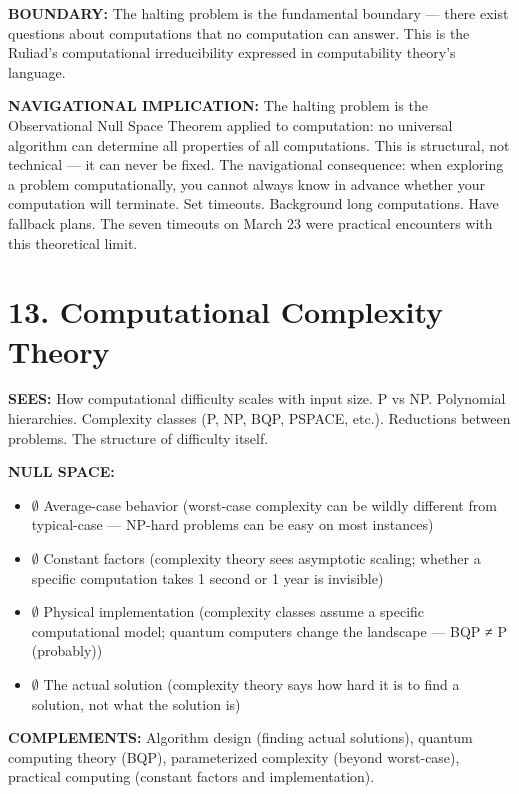 \textbf{BOUNDARY:} The halting problem is the fundamental boundary — there exist questions about computations that no computation can answer. This is the Ruliad's computational irreducibility expressed in computability theory's language.


\textbf{NAVIGATIONAL IMPLICATION:} The halting problem is the Observational Null Space Theorem applied to computation: no universal algorithm can determine all properties of all computations. This is structural, not technical — it can never be fixed. The navigational consequence: when exploring a problem computationally, you cannot always know in advance whether your computation will terminate. Set timeouts. Background long computations. Have fallback plans. The seven timeouts on March 23 were practical encounters with this theoretical limit.


\bigskip\noindent\makebox[\textwidth]{\color{rulegray}\rule{5cm}{0.3pt}}\bigskip


\section*{13. Computational Complexity Theory}


\textbf{SEES:} How computational difficulty scales with input size. P vs NP. Polynomial hierarchies. Complexity classes (P, NP, BQP, PSPACE, etc.). Reductions between problems. The structure of difficulty itself.


\textbf{NULL SPACE:}

\begin{itemize}[nosep,leftmargin=*]
  \item $\emptyset$ Average-case behavior (worst-case complexity can be wildly different from typical-case — NP-hard problems can be easy on most instances)
  \item $\emptyset$ Constant factors (complexity theory sees asymptotic scaling; whether a specific computation takes 1 second or 1 year is invisible)
  \item $\emptyset$ Physical implementation (complexity classes assume a specific computational model; quantum computers change the landscape — BQP ≠ P (probably))
  \item $\emptyset$ The actual solution (complexity theory says how hard it is to find a solution, not what the solution is)
\end{itemize}


\textbf{COMPLEMENTS:} Algorithm design (finding actual solutions), quantum computing theory (BQP), parameterized complexity (beyond worst-case), practical computing (constant factors and implementation).


